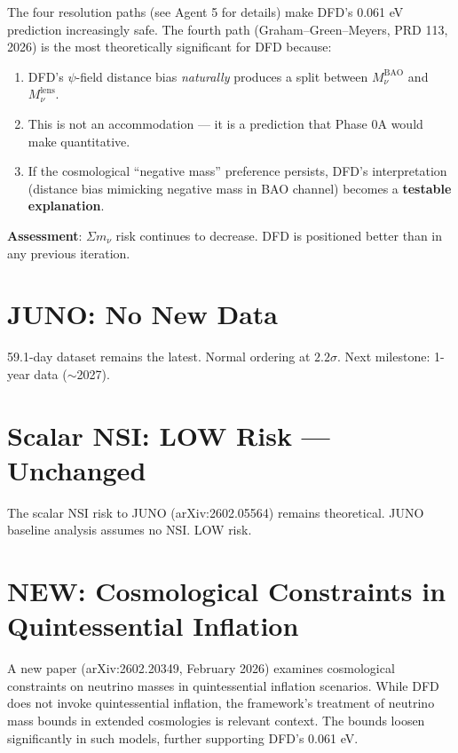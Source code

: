 \documentclass[11pt,a4paper]{article}
\newcommand{\NEW}{\textcolor{dfdblue}{\textbf{NEW}}}
\begin{document}
\begin{tcolorbox}[colback=green!5!white, colframe=green!60!black,
  title={$\Sigma m_\nu$: Fourth Path (Two-Mass-Parameter) Particularly Favorable for DFD}]

The four resolution paths (see Agent 5 for details) make DFD's 0.061 eV prediction increasingly safe. The fourth path (Graham--Green--Meyers, PRD 113, 2026) is the most theoretically significant for DFD because:

\begin{enumerate}
\item DFD's $\psi$-field distance bias \emph{naturally} produces a split between $M_\nu^{\text{BAO}}$ and $M_\nu^{\text{lens}}$.
\item This is not an accommodation --- it is a prediction that Phase 0A would make quantitative.
\item If the cosmological ``negative mass'' preference persists, DFD's interpretation (distance bias mimicking negative mass in BAO channel) becomes a \textbf{testable explanation}.
\end{enumerate}

\textbf{Assessment}: $\Sigma m_\nu$ risk continues to decrease. DFD is positioned better than in any previous iteration.
\end{tcolorbox}

\section{JUNO: No New Data}

59.1-day dataset remains the latest. Normal ordering at $2.2\sigma$. Next milestone: 1-year data ($\sim$2027).

\section{Scalar NSI: LOW Risk --- Unchanged}

The scalar NSI risk to JUNO (arXiv:2602.05564) remains theoretical. JUNO baseline analysis assumes no NSI. LOW risk.

\section{\NEW: Cosmological Constraints in Quintessential Inflation}

A new paper (arXiv:2602.20349, February 2026) examines cosmological constraints on neutrino masses in quintessential inflation scenarios. While DFD does not invoke quintessential inflation, the framework's treatment of neutrino mass bounds in extended cosmologies is relevant context. The bounds loosen significantly in such models, further supporting DFD's 0.061 eV.
\end{document}
